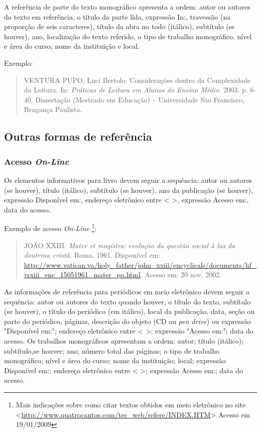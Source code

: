 \documentclass[
	12pt,				%
	openright,			%
	oneside,			%
	a4paper,			%
	english,			%
	french,				%
	spanish,			%
	brazil				%
	]{abntex2}
\begin{document}
\par A referência de parte do texto monográfico apresenta a ordem: autor ou autores do texto em referência, o título da parte lida, expressão In:, travessão (na proporção de seis caracteres), título da obra no todo (itálico), subtítulo (se houver), ano, localização do texto referido, o tipo de trabalho monográfico, nível e área do curso, nome da instituição e local.

\par Exemplo:

\begin{quote}
VENTURA PUPO, Lucí Bertolo. Considerações dentro da Complexidade da Leitura. In: \textit{Práticas de Leitura em Alunos do Ensino Médio.} 2003. p. 6-40. Dissertação (Mestrado em Educação) \verb*#-# Universidade São Francisco, Bragança Paulista.
\end{quote}


\subsection{Outras formas de referência}

\subsubsection{Acesso \textit{On-Line}}

\par Os elementos informativos para livro devem seguir a sequência: autor ou autores (se houver), título (itálico), subtítulo (se houver), ano da publicação (se houver), expressão Disponível em:, endereço eletrônico entre < >, expressão Acesso em:, data do acesso.

\par Exemplo de acesso \textit{On-Line} \protect \footnote{Mais indicações sobre como citar textos obtidos em meio eletrônico no site <\protect {}\url{http://www.quatrocantos.com/tec_web/refere/INDEX.HTM}> Acesso em 19/01/2009}:

\begin{quote}
JOÃO XXIII. \textit{Mater et magistra: evolução da questão social à luz da doutrina cristã.} Roma. 1961. Disponível  em: \protect {}\url{http://www.vatican.va/holy_father/john_xxiii/encyclicals/documents/hf_jxxiii_enc_15051961_mater_po.html}. Acesso em: 20 nov. 2002.
\end{quote}

\par As informações de referência para periódicos em meio eletrônico devem seguir a sequência: autor ou autores do texto quando houver, o título do texto, subtítulo (se houver), o título do periódico (em itálico), local da publicação, data, seção ou parte do periódico, páginas, descrição do objeto (CD ou \textit{pen drive}) ou expressão "Disponível em:"; endereço eletrônico entre < >; expressão "Acesso em:"; data do acesso. Os trabalhos monográficos apresentam a ordem: autor; título (itálico); subtítulo,se houver; ano; número total das páginas; o tipo de trabalho monográfico; nível e área do curso; nome da instituição; local; expressão Disponível em:; endereço eletrônico entre < >; expressão Acesso em:; data do acesso.
\end{document}
